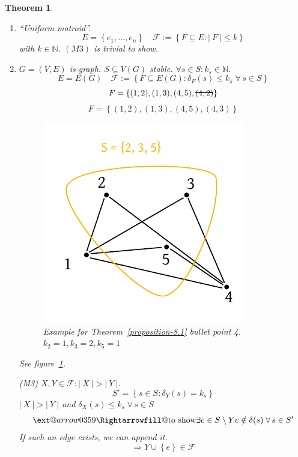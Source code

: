 \documentclass{article}
\makeatletter
\newtheorem{theorem}{Theorem}
\newcommand{\card}[1]{\left|\:\!#1\:\!\right|}
\newcommand{\set}[1]{\left\{#1\right\}}
\newcommand{\fall}{\;\forall\,}
\newcommand{\xRightarrow}[2][]{\ext@arrow 0359\Rightarrowfill@{#1}{#2}}
\newcommand\hcancel[2][black]{\setbox0=\hbox{$#2$}%
\rlap{\raisebox{.45\ht0}{\textcolor{#1}{\rule{\wd0}{1pt}}}}#2}
\makeatother
\begin{document}
\begin{theorem}
\begin{enumerate}
    \item ``\emph{Uniform matroid}''. 
      \[ E = \set{e_1, \ldots, e_n} \quad \mathcal{F} := \set{F \subseteq E: \card{F} \leq k} \]
      with $k \in \mathbb{N}$. $(M3)$ is trivial to show.

    \item $G = (V, E)$ is graph. $S \subseteq V(G)$ stable. $\forall s \in S: k_s \in \mathbb{N}$.
      \[ E = E(G) \quad \mathcal{F} := \set{F \subseteq E(G): \delta_F(s) \leq k_s \fall s \in S} \]
      \[ F = \set{(1, 2), (1, 3), (4, 5), \hcancel{(4, 2)}} \]
      \[ F = \set{(1, 2), (1, 3), (4, 5), (4, 3)} \]

      \begin{figure}[!ht]
        \begin{center}
          \includegraphics{img/matroid_example_for_4.pdf}
          \caption{Example for Theorem~\ref{proposition-8.1} bullet point 4. $k_2 = 1, k_3 = 2, k_5 = 1$}
          \label{fig:prop81-4-example}
        \end{center}
      \end{figure}

      See figure~\ref{fig:prop81-4-example}.

      (M3) $X, Y \in \mathcal{F}: \card{X} > \card{Y}$.
      \[
        S' = \set{s \in S: \delta_Y(s) = k_s}
      \]
      $\card{X} > \card{Y}$ and $\delta_X(s) \leq k_s \fall s \in S$
      \[
        \xRightarrow{\text{to show}}
          \exists e \in S \setminus Y
          e \notin \delta(s)
          \fall s \in S'
      \]
      If such an edge exists, we can append it.
      \[
        \Rightarrow Y \cup \set{e} \in \mathcal{F}
      \]


\end{enumerate}
\end{theorem}
\end{document}
